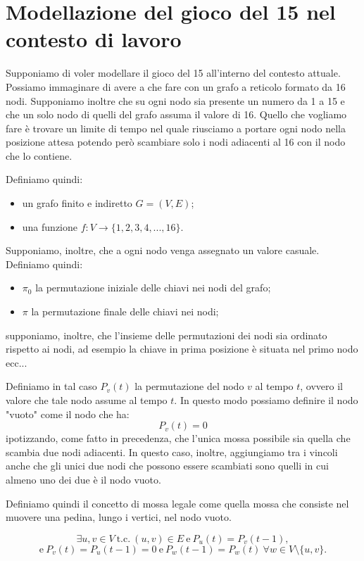 \chapter{Modellazione del gioco del 15 nel contesto di lavoro}
\label{modellazione}
Supponiamo di voler modellare il gioco del 15 all'interno del contesto attuale. 
Possiamo immaginare di avere a che fare con un grafo a reticolo formato da 16 nodi.
Supponiamo inoltre che su ogni nodo sia presente un numero da 1 a 15 e che un solo nodo di quelli del grafo assuma il valore di 16. 
Quello che vogliamo fare è trovare un limite di tempo nel quale riusciamo a portare ogni nodo nella posizione attesa potendo però scambiare solo i nodi adiacenti al 16 con il nodo che lo contiene. 

Definiamo quindi: 
\begin{itemize}
    \item un grafo finito e indiretto $G=(V,E)$;
    \item una funzione $f: V \rightarrow \{1,2,3,4,...,16\}$.
\end{itemize}

Supponiamo, inoltre, che a ogni nodo venga assegnato un valore casuale. 
Definiamo quindi:
\begin{itemize}
    \item $\pi_0$ la permutazione iniziale delle chiavi nei nodi del grafo;
    \item $\pi$ la permutazione finale delle chiavi nei nodi; 
\end{itemize} supponiamo, inoltre, che l'insieme delle permutazioni dei nodi sia ordinato rispetto ai nodi, ad esempio la chiave in prima posizione è situata nel primo nodo ecc...

Definiamo in tal caso $P_v(t)$ la permutazione del nodo $v$ al tempo $t$, ovvero il valore che tale nodo assume al tempo $t$.
In questo modo possiamo definire il nodo "vuoto" come il nodo che ha:
$$
P_v(t)=0
$$
ipotizzando, come fatto in precedenza, che l'unica mossa possibile sia quella che scambia due nodi adiacenti.
In questo caso, inoltre, aggiungiamo tra i vincoli anche che gli unici due nodi che possono essere scambiati sono quelli in cui almeno uno dei due è il nodo vuoto. 

Definiamo quindi il concetto di mossa legale come quella mossa che consiste nel muovere una pedina, lungo i vertici, nel nodo vuoto. \label{configurazione legale}

\[
\exists u, v \in V \ \text{t.c.} \ (u, v) \in E \ \text{e} \ P_u(t) = P_v(t-1),
\]
\[
\text{e} \ P_v(t) = P_u(t-1) = 0 \ \text{e} \ P_w(t-1) = P_w(t) \ \forall w \in V \setminus \{u, v\}.
\]

